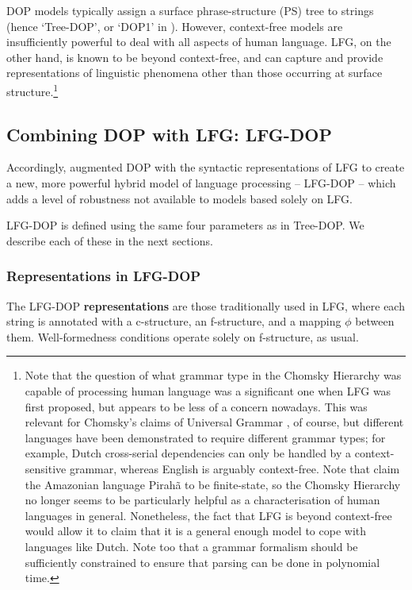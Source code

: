 \documentclass[output=paper,hidelinks]{langscibook}
\begin{document}
DOP models typically assign a surface phrase-structure (PS) tree to strings (hence `Tree-DOP', or `DOP1' in \citet{Bod92}). However, context-free models are insufficiently powerful to
deal with all aspects of human language. LFG, on the other hand, is known to be beyond context-free, and can capture and provide representations of linguistic phenomena other than those occurring at surface structure.\footnote{Note that the question of what grammar type in the Chomsky Hierarchy \citep{chom:56} was capable of processing human language was a significant one when LFG was first proposed, but appears to be less of a concern nowadays. This was relevant for Chomsky's claims of Universal Grammar \citep{chomsky1981lectures}, of course, but different languages have been demonstrated to require different grammar types; for example, Dutch cross-serial dependencies can only be handled by a context-sensitive grammar, whereas English is arguably context-free. Note that \citet{futrell} claim the Amazonian language Pirah\~a to be finite-state, so the Chomsky Hierarchy  no longer seems to be particularly helpful as a characterisation of human languages in general.  Nonetheless, the fact that LFG is beyond context-free would allow it to claim that it is a general enough model to cope with languages like Dutch. Note too that a grammar formalism should be sufficiently constrained to ensure that parsing can be done in polynomial time.}

\subsection{Combining DOP with LFG: LFG-DOP}
Accordingly, \citet{bod-kaplan-1998-probabilistic-corpus} augmented DOP with the syntactic representations of LFG to create a new, more powerful hybrid model of language processing -- LFG-DOP -- which adds a level of robustness not available to models based solely on LFG.

LFG-DOP is defined using the same four parameters as in Tree-DOP.
We describe each of these in the next sections.

\subsubsection{Representations in LFG-DOP }

The LFG-DOP {\normalfont \bfseries  representations} are those traditionally used in LFG, where each string is annotated with a c-structure, an f-structure, and a mapping $\phi$ between them. Well-formedness conditions operate solely on f-structure, as usual.
\end{document}

